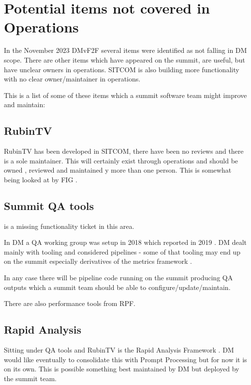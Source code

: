 \section{Potential items not covered in \gls{Operations}} \label{sec:items}

In the November 2023 DMvF2F several items were identified as not falling in \gls{DM} scope.
There are other items which have appeared on the summit, are useful, but have unclear owners in operations.
\gls{SITCOM} is also building more functionality with no clear owner/maintainer in operations.

This is a list of some of these items which a summit \gls{software} team might improve and maintain:

\subsection{ RubinTV }
 RubinTV  has been developed in \gls{SITCOM}, there have been no reviews and there is a sole maintainer.
This will certainly exist through operations and should be owned , reviewed and maintained y more than one person.
This is somewhat being looked at by FIG .

\subsection{ Summit \gls{QA} tools}
 is a missing functionality ticket in this area.

In DM a \gls{QA} working group was setup in 2018  which reported in 2019 .
DM dealt mainly with tooling and considered pipelines - some of that tooling may end up on the summit especially derivatives of the metrics framework .

In any case there will be pipeline code running on the summit producing QA outputs which a summit team should be able to configure/update/maintain.

There are also performance tools from RPF.

\subsection{ Rapid Analysis }
Sitting under QA tools and RubinTV is the Rapid Analysis Framework .
DM would like eventually to consolidate this with Prompt Processing but for now it is on its own.
This is possible something best maintained by DM but deployed by the summit team.


